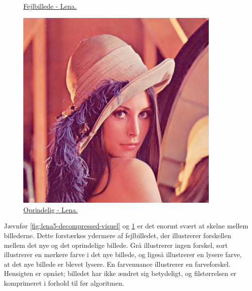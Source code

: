 \begin{figure}[htbp]
\begin{minipage}{0.3\textwidth}
\caption{\href{https://www.dropbox.com/home/P1\%20-\%20B205/vejleder/billeder/DCT/Fejlbilleder?preview=fejl50.png}{Fejlbillede - Lena.}}
\label{fig:lena1-org-fejl}
\end{minipage}
\hspace{0.5cm}
\begin{minipage}{0.3\textwidth}
\centering
\includegraphics[width=0.9\textwidth]{Billeder/LenaAnvendelse/LENABILLEDE/lena1-org.png}
\caption{\href{https://www.dropbox.com/home/P1\%20-\%20B205/vejleder/billeder?preview=lena-org.tiff}{Oprindelig - Lena.}}
\label{fig:lena1-org-visuel}
\end{minipage}
\end{figure}

Jævnfør \ref{fig:lena5-decompressed-visuel} og \ref{fig:lena1-org-visuel} er det enormt svært at skelne mellem billederne. Dette forstærkes ydermere af fejlbilledet, der illustrerer forskellen mellem det nye og det oprindelige billede. Grå illustrerer ingen forskel, sort illustrerer en mørkere farve i det nye billede, og ligeså illustrerer en lysere farve, at det nye billede er blevet lysere. En farvenuance illustrerer en farveforskel. Hensigten er opnået; billedet har ikke ændret sig betydeligt, og filstørrelsen er komprimeret i forhold til før algoritmen.